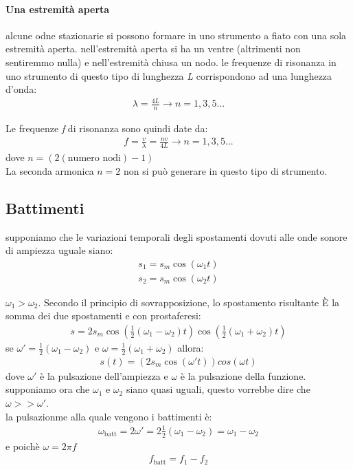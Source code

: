 \documentclass[a4paper,11pt]{article}
\begin{document}
\paragraph{Una estremità aperta}
alcune odne stazionarie si possono formare in uno strumento a fiato con una sola estremità aperta. nell'estremità aperta si ha un ventre (altrimenti non sentiremmo nulla) e nell'estremità chiusa un nodo. le frequenze di risonanza in uno strumento di questo tipo di lunghezza \textit{L} corrispondono ad una lunghezza d'onda:
\begin{align*}
    \lambda = \frac{4L}{n} \rightarrow n = 1,3,5...
\end{align*}

Le frequenze \textit{f} di risonanza sono quindi date da: 
\begin{align*}
    f = \frac{v}{\lambda} = \frac{nv}{4L} \rightarrow n = 1,3,5...
\end{align*}
dove \hspace{2.5mm }\( n = \left( 2 \left(\text{numero nodi}\right) -1 \right) \)
\\
La seconda armonica \(n = 2\) non si può generare in questo tipo di strumento.

\subsection{Battimenti}

supponiamo che le variazioni temporali degli spostamenti dovuti alle onde sonore di ampiezza uguale siano:
\begin{align}
    s_1 = s_m \cos(\omega_1t)
    \\
    s_2 = s_m\cos(\omega_2t)
\end{align}

\(\omega_1 > \omega_2\). Secondo il principio di sovrapposizione, lo spostamento risultante È la somma dei due spostamenti e con prostaferesi:
\begin{align*}
    s = 2s_m \cos\left(\frac{1}{2} (\omega_1 - \omega_2) t  \right) \cos\left(\frac{1}{2} (\omega_1 + \omega_2) t  \right)
\end{align*}
se \(\omega' = \frac{1}{2} (\omega_1 - \omega_2)\) e \(\omega = \frac{1}{2} (\omega_1 + \omega_2) \) allora:
\begin{align*}
    s(t) = \left(2s_m \cos(\omega' t)\right) cos(\omega t)
\end{align*}
dove \(\omega' \) è la pulsazione dell'ampiezza e \(\omega\) è la pulsazione della funzione.
\\
supponiamo ora che \(\omega_1 \) e \(\omega_2\) siano quasi uguali, questo vorrebbe dire che \(\omega >> \omega'\). 
\\ 
la pulsazionme alla quale vengono i battimenti è:
\begin{align*}
    \omega_\text{batt} = 2\omega ' = 2 \frac{1}{2} (\omega_1 - \omega_2) = \omega_1 - \omega_2
\end{align*}
     e poichè \(\omega = 2\pi f \) 
     \begin{align*}
         f_\text{batt} = f_1 - f_2
     \end{align*}
\end{document}
